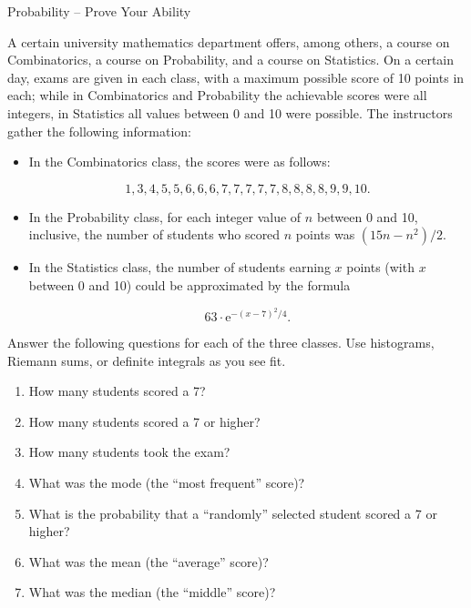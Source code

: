 \documentclass[12pt]{article}
\begin{document}
\begin{center}

{\Large Probability -- Prove Your Ability} 

\end{center}

\vspace*{.2in}


\noindent  A certain university mathematics department offers, among others, a course on Combinatorics, a course on Probability, and a course on Statistics.  On a certain day, exams are given in each class, with a maximum possible score of 10 points in each; while in Combinatorics and Probability the achievable scores were all integers, in Statistics all values between 0 and 10 were possible.  The instructors gather the following information:

\begin{itemize}
  \item In the Combinatorics class, the scores were as follows:
  
$$1, 3, 4, 5, 5, 6, 6, 6, 7, 7, 7, 7, 7, 8, 8, 8, 8, 9, 9, 10.$$

\item In the Probability class, for each integer value of $n$ between 0 and 10, inclusive, the number of students who scored $n$ points was $(15n-n^2)/2$.

\item In the Statistics class, the number of students earning $x$ points (with $x$ between 0 and 10) could be approximated by the formula

$$63 \cdot \mathrm{e}^{-(x-7)^2/4}.$$

\end{itemize}

Answer the following questions for each of the three classes.  Use histograms, Riemann sums, or definite integrals as you see fit.


\begin{enumerate}

\item  How many students scored a 7?

\item  How many students scored a 7 or higher?

\item  How many students took the exam?

\item  What was the mode (the ``most frequent'' score)?

\item  What is the probability that a ``randomly'' selected student scored a 7 or higher?

\item  What was the mean (the ``average'' score)?

\item  What was the median (the ``middle'' score)?


\end{enumerate}
\end{document}
